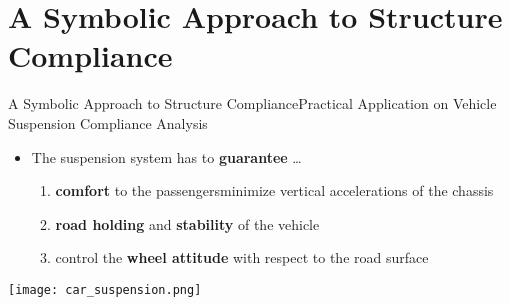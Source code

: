 \section{A Symbolic Approach to Structure Compliance}

\begin{frame}{A Symbolic Approach to Structure Compliance}{Practical Application on Vehicle Suspension Compliance
  Analysis}
  \begin{minipage}[c]{0.6\textwidth}
    \begin{itemize}
      \item The suspension system has to \textbf{guarantee} \dots
      \begin{enumerate}
        \item \textbf{comfort} to the passengers{minimize vertical accelerations of the chassis}
        \item \textbf{road holding} and \textbf{stability} of the vehicle
        \item control the \textbf{wheel attitude} with respect to the road surface
      \end{enumerate}
      \hspace{0.5cm}
    \end{itemize}
  \end{minipage}
  \begin{minipage}[c]{0.35\textwidth}
    \texttt{[image: car\_suspension.png]}
  \end{minipage}
\end{frame}

